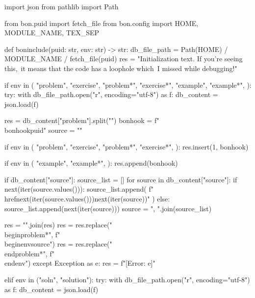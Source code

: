 \begin{pycode}
import json
from pathlib import Path

from bon.puid import fetch_file
from bon.config import HOME, MODULE_NAME, TEX_SEP


def boninclude(puid: str, env: str) -> str:
    db_file_path = Path(HOME) / MODULE_NAME / fetch_file(puid)
    res = "Initialization text. If you're seeing this,\
        it means that the code has a loophole which\
        I missed while debugging!"

    if env in (
        "problem",
        "exercise",
        "problem*",
        "exercise*",
        "example",
        "example*",
    ):
        try:
            with db_file_path.open("r", encoding="utf-8") as f:
                db_content = json.load(f)

            res = db_content["problem"].split("\n")
            bonhook = f"  \\bonhook{{{puid}}}"
            source = ""

            if env in (
                "problem",
                "exercise",
                "problem*",
                "exercise*",
            ):
                res.insert(1, bonhook)

            if env in (
                "example",
                "example*",
            ):
                res.append(bonhook)

            if db_content["source"]:
                source_list = []
                for source in db_content["source"]:
                    if next(iter(source.values())):
                        source_list.append(
                            f"\\href{{{next(iter(source.values()))}}}{{{next(iter(source))}}}"
                        )
                    else:
                        source_list.append(next(iter(source)))
                source = ", ".join(source_list)

            res = "\n".join(res)
            res = res.replace("\\begin{problem*}{}", f"\\begin{{{env}}}{{{source}}}")
            res = res.replace("\\end{problem*}", f"\\end{{{env}}}")
        except Exception as e:
            res = f"[Error: {e}]"

    elif env in ("soln", "solution"):
        try:
            with db_file_path.open("r", encoding="utf-8") as f:
                db_content = json.load(f)


\end{pycode}
